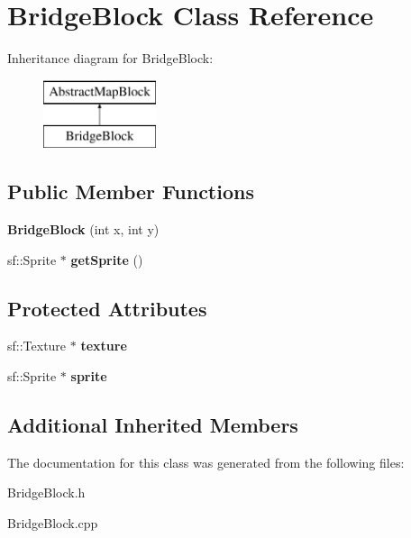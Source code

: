 \hypertarget{class_bridge_block}{}\section{Bridge\+Block Class Reference}
\label{class_bridge_block}
Inheritance diagram for Bridge\+Block\+:\begin{figure}[H]
\begin{center}
\leavevmode
\includegraphics[height=2.000000cm]{class_bridge_block}
\end{center}
\end{figure}
\subsection*{Public Member Functions}
\begin{DoxyCompactItemize}
\item 
\mbox{\label{class_bridge_block_a17bb807971dbc0b222a27e6bd18a9085}} 
{\bfseries Bridge\+Block} (int x, int y)
\item 
\mbox{\label{class_bridge_block_a6ea5fa76b21c9805702c7f214e661198}} 
sf\+::\+Sprite $\ast$ {\bfseries get\+Sprite} ()
\end{DoxyCompactItemize}
\subsection*{Protected Attributes}
\begin{DoxyCompactItemize}
\item 
\mbox{\label{class_bridge_block_aeab425af654b8ae2edc7ba29421fe5b0}} 
sf\+::\+Texture $\ast$ {\bfseries texture}
\item 
\mbox{\label{class_bridge_block_a93817188870fb7eb4137a90a7025a748}} 
sf\+::\+Sprite $\ast$ {\bfseries sprite}
\end{DoxyCompactItemize}
\subsection*{Additional Inherited Members}


The documentation for this class was generated from the following files\+:\begin{DoxyCompactItemize}
\item 
Bridge\+Block.\+h\item 
Bridge\+Block.\+cpp\end{DoxyCompactItemize}
